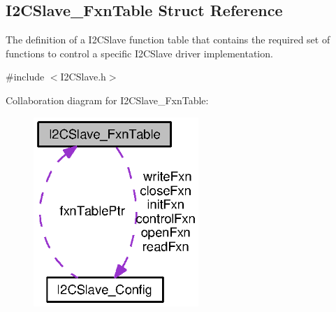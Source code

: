 \subsection{I2\+C\+Slave\+\_\+\+Fxn\+Table Struct Reference}
\label{struct_i2_c_slave___fxn_table}


The definition of a I2\+C\+Slave function table that contains the required set of functions to control a specific I2\+C\+Slave driver implementation.  




{\ttfamily \#include $<$I2\+C\+Slave.\+h$>$}



Collaboration diagram for I2\+C\+Slave\+\_\+\+Fxn\+Table\+:
\nopagebreak
\begin{figure}[H]
\begin{center}
\leavevmode
\includegraphics[width=177pt]{struct_i2_c_slave___fxn_table__coll__graph}
\end{center}
\end{figure}
